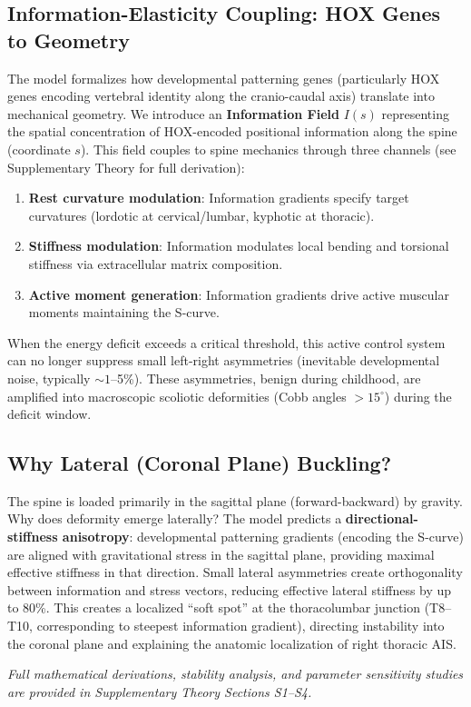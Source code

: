 \subsection{Information-Elasticity Coupling: HOX Genes to Geometry}

The model formalizes how developmental patterning genes (particularly HOX genes encoding vertebral identity along the cranio-caudal axis) translate into mechanical geometry. We introduce an \textbf{Information Field} $I(s)$ representing the spatial concentration of HOX-encoded positional information along the spine (coordinate $s$). This field couples to spine mechanics through three channels (see Supplementary Theory for full derivation):

\begin{enumerate}
\item \textbf{Rest curvature modulation}: Information gradients specify target curvatures (lordotic at cervical/lumbar, kyphotic at thoracic).
\item \textbf{Stiffness modulation}: Information modulates local bending and torsional stiffness via extracellular matrix composition.
\item \textbf{Active moment generation}: Information gradients drive active muscular moments maintaining the S-curve.
\end{enumerate}

When the energy deficit exceeds a critical threshold, this active control system can no longer suppress small left-right asymmetries (inevitable developmental noise, typically $\sim 1$--5\%). These asymmetries, benign during childhood, are amplified into macroscopic scoliotic deformities (Cobb angles $> 15^{\circ}$) during the deficit window.

\subsection{Why Lateral (Coronal Plane) Buckling?}

The spine is loaded primarily in the sagittal plane (forward-backward) by gravity. Why does deformity emerge laterally? The model predicts a \textbf{directional-stiffness anisotropy}: developmental patterning gradients (encoding the S-curve) are aligned with gravitational stress in the sagittal plane, providing maximal effective stiffness in that direction. Small lateral asymmetries create orthogonality between information and stress vectors, reducing effective lateral stiffness by up to 80\%. This creates a localized ``soft spot'' at the thoracolumbar junction (T8--T10, corresponding to steepest information gradient), directing instability into the coronal plane and explaining the anatomic localization of right thoracic AIS.

\textit{Full mathematical derivations, stability analysis, and parameter sensitivity studies are provided in Supplementary Theory Sections S1--S4.}
